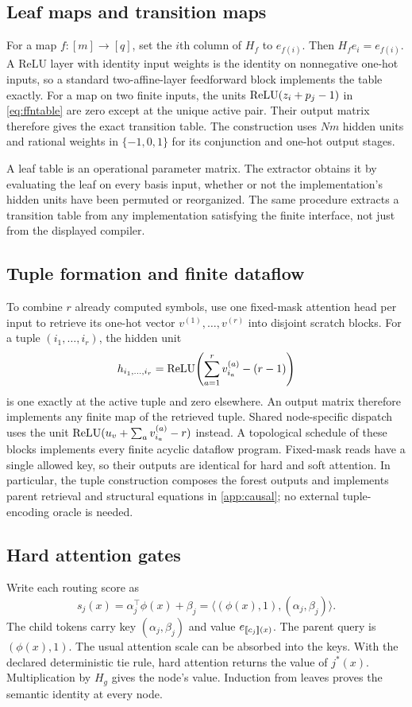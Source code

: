 \subsection{Leaf maps and transition maps}
For a map $f:[m]\to[q]$, set the $i$th column of $H_f$ to $e_{f(i)}$. Then $H_fe_i=e_{f(i)}$. A ReLU layer with identity input weights is the identity on nonnegative one-hot inputs, so a standard two-affine-layer feedforward block implements the table exactly. For a map on two finite inputs, the units $\operatorname{ReLU}(z_i+p_j-1)$ in \eqref{eq:ffntable} are zero except at the unique active pair. Their output matrix therefore gives the exact transition table. The construction uses $Nm$ hidden units and rational weights in $\{-1,0,1\}$ for its conjunction and one-hot output stages.

A leaf table is an operational parameter matrix. The extractor obtains it by evaluating the leaf on every basis input, whether or not the implementation's hidden units have been permuted or reorganized. The same procedure extracts a transition table from any implementation satisfying the finite interface, not just from the displayed compiler.

\subsection{Tuple formation and finite dataflow}
To combine $r$ already computed symbols, use one fixed-mask attention head per input to retrieve its one-hot vector $v^{(1)},\ldots,v^{(r)}$ into disjoint scratch blocks. For a tuple $(i_1,\ldots,i_r)$, the hidden unit
\begin{equation}
 h_{i_1,\ldots,i_r}=\operatorname{ReLU}\!\left(\sum_{a=1}^r v^{(a)}_{i_a}-(r-1)\right)
 \label{eq:tuple}
\end{equation}
is one exactly at the active tuple and zero elsewhere. An output matrix therefore implements any finite map of the retrieved tuple. Shared node-specific dispatch uses the unit
$\operatorname{ReLU}(u_v+\sum_a v^{(a)}_{i_a}-r)$ instead. A topological schedule of these blocks implements every finite acyclic dataflow program. Fixed-mask reads have a single allowed key, so their outputs are identical for hard and soft attention. In particular, the tuple construction composes the forest outputs and implements parent retrieval and structural equations in \cref{app:causal}; no external tuple-encoding oracle is needed.

\subsection{Hard attention gates}
Write each routing score as
\[
 s_j(x)=\alpha_j^\top\phi(x)+\beta_j
 =\langle (\phi(x),1),(\alpha_j,\beta_j)\rangle.
\]
The child tokens carry key $(\alpha_j,\beta_j)$ and value $e_{[\![c_j]\!](x)}$. The parent query is $(\phi(x),1)$. The usual attention scale can be absorbed into the keys. With the declared deterministic tie rule, hard attention returns the value of $j^*(x)$. Multiplication by $H_g$ gives the node's value. Induction from leaves proves the semantic identity at every node.

